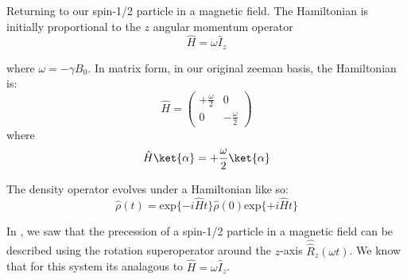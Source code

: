 Returning to our spin-1/2 particle in a magnetic field. The Hamiltonian is initially
proportional to the $z$ angular momentum operator
\begin{equation}
  \hat{H} = \omega\hat{I}_z
\end{equation}

where $\omega = -\gamma B_0$. In matrix form, in our original zeeman basis, the Hamiltonian is:
\begin{equation}
  \hat{H} = \begin{pmatrix}
+\frac{\omega}{2} & 0\\
0 & -\frac{\omega}{2}
\end{pmatrix}
\end{equation}
where
\begin{equation}
  \hat{H}\ket{\alpha} = +\frac{\omega}{2}\ket{\alpha}
\end{equation}

The density operator evolves under a Hamiltonian like so:
\begin{equation}
  \hat\rho(t) = \text{exp}\{-i\hat{H}t\}\hat\rho(0)\text{exp}\{+i\hat{H}t\}
\end{equation}

In , we saw that the precession of a spin-1/2 particle in a magnetic field can be described using the rotation superoperator around the $z$-axis $\hat{\hat{R}}_z(\omega t)$. We know that for this system its analagous to $\hat{H} = \omega\hat{I}_z$.

